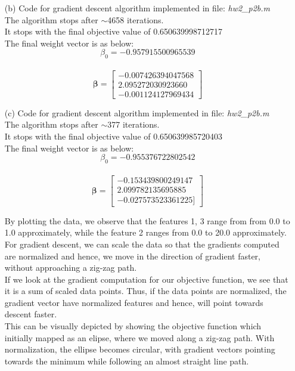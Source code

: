 \documentclass[fleqn]{article}
\begin{document}
\begin{itemize}
	\item[(b)]
	Code for gradient descent algorithm implemented in file: \textit{hw2\_p2b.m}\\
	The algorithm stops after $\sim$4658 iterations.\\
	It stops with the final objective value of 0.650639998712717\\
	The final weight vector is as below:\\
	\[\beta_0 = -0.957915500965539\]\\
	\[
	\bm{\beta} =
		\begin{bmatrix}
		-0.007426394047568\\
		2.095272030923660\\
		-0.001124127969434
		\end{bmatrix}
	\]

	\item[(c)]
	Code for gradient descent algorithm implemented in file: \textit{hw2\_p2b.m}\\
	The algorithm stops after $\sim$377 iterations.\\
	It stops with the final objective value of 0.650639985720403\\
	The final weight vector is as below:\\
	\[\beta_0 = -0.955376722802542\]\\
	\[
	\bm{\beta} =
		\begin{bmatrix}
		-0.153439800249147\\
		2.099782135695885\\
		-0.027573523361225]
		\end{bmatrix}
	\]

	By plotting the data, we observe that the features 1, 3 range from from 0.0 to 1.0 approximately, while the feature 2 ranges from 0.0 to 20.0 approximately.\\
	For gradient descent, we can scale the data so that the gradients computed are normalized and 
	hence, we move in the direction of gradient faster, without approaching a zig-zag path.\\
	If we look at the gradient computation for our objective function, we see that it is a sum of scaled data points. 
	Thus, if the data points are normalized, the gradient vector have normalized features and hence, will point towards 
	descent faster.\\
	This can be visually depicted by showing the objective function which initially mapped as an elipse, 
	where we moved along a zig-zag path. With normalization, the ellipse becomes circular, with gradient 
	vectors pointing towards the minimum while following an almost straight line path.\\


\end{itemize}
\end{document}
